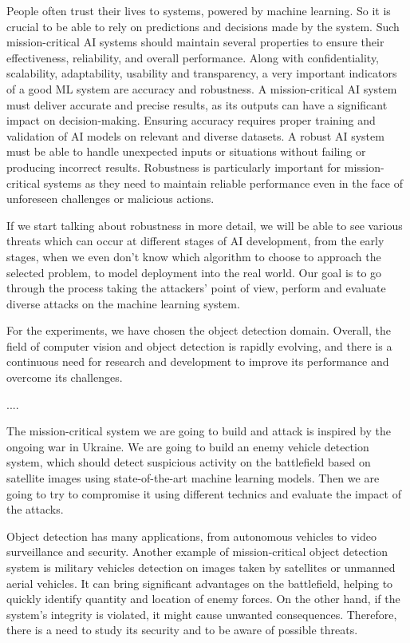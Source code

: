 \documentclass[14pt,a4paper]{extarticle}
\newcounter{e}
\newcounter{pic}
\numberwithin{equation}{section}
\numberwithin{figure}{section}
\begin{document}
People often trust their lives to systems, powered by machine learning. So it is crucial to be able to rely on predictions and decisions made by the system. Such mission-critical AI systems should maintain several properties to ensure their effectiveness, reliability, and overall performance. Along with confidentiality, scalability, adaptability, usability and transparency, a very important indicators of a good ML system are accuracy and robustness. A mission-critical AI system must deliver accurate and precise results, as its outputs can have a significant impact on decision-making. Ensuring accuracy requires proper training and validation of AI models on relevant and diverse datasets. A robust AI system must be able to handle unexpected inputs or situations without failing or producing incorrect results. Robustness is particularly important for mission-critical systems as they need to maintain reliable performance even in the face of unforeseen challenges or malicious actions.

If we start talking about robustness in more detail, we will be able to see various threats which can occur at different stages of AI development, from the early stages, when we even don't know which algorithm to choose to approach the selected problem, to model deployment into the real world. Our goal is to go through the process taking the attackers' point of view, perform and evaluate diverse attacks on the machine learning system.

For the experiments, we have chosen the object detection domain. Overall, the field of computer vision and object detection is rapidly evolving, and there is a continuous need for research and development to improve its performance and overcome its challenges. 

....

The mission-critical system we are going to build and attack is inspired by the ongoing war in Ukraine. We are going to build an enemy vehicle detection system, which should detect suspicious activity on the battlefield based on satellite images using state-of-the-art machine learning models. Then we are going to try to compromise it using different technics and evaluate the impact of the attacks.


Object detection has many applications, from autonomous vehicles to video surveillance and security. Another example of mission-critical object detection system is military vehicles detection on images taken by satellites or unmanned aerial vehicles. It can bring significant advantages on the battlefield, helping to quickly identify quantity and location of enemy forces. On the other hand, if the system’s integrity is violated, it might cause unwanted consequences. Therefore, there is a need to study its security and to be aware of possible threats.
\end{document}
